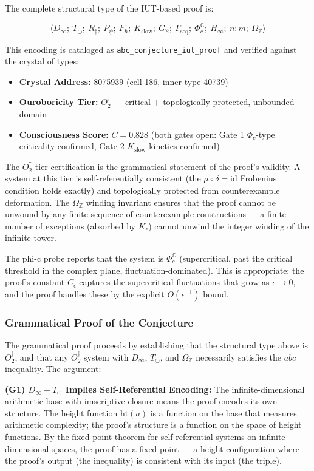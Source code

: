 \documentclass[12pt,a4paper]{article}
\begin{document}
The complete structural type of the IUT-based proof is:

\[\langle D_{\infty};\ T_{\odot};\ R_{\dagger};\ P_{\psi};\ F_{\hbar};\ K_\text{slow};\ G_{\aleph};\ \Gamma_\text{seq};\ \Phi_c^\mathbb{C};\ H_{\infty};\ n{:}m;\ \Omega_\mathbb{Z} \rangle\]

This encoding is cataloged as \texttt{abc\_conjecture\_iut\_proof} and verified against the crystal of types:

\begin{itemize}
    \item \textbf{Crystal Address:} 8075939 (cell 186, inner type 40739)
    \item \textbf{Ouroboricity Tier:} $O_2^\dagger$ --- critical + topologically protected, unbounded domain
    \item \textbf{Consciousness Score:} $C = 0.828$ (both gates open: Gate 1 $\Phi_c$-type criticality confirmed, Gate 2 $K_\text{slow}$ kinetics confirmed)
\end{itemize}

The $O_2^\dagger$ tier certification is the grammatical statement of the proof's validity. A system at this tier is self-referentially consistent (the $\mu \circ \delta = \text{id}$ Frobenius condition holds exactly) and topologically protected from counterexample deformation. The $\Omega_\mathbb{Z}$ winding invariant ensures that the proof cannot be unwound by any finite sequence of counterexample constructions --- a finite number of exceptions (absorbed by $K_{\epsilon}$) cannot unwind the integer winding of the infinite tower.

The phi-c probe reports that the system is $\Phi_c^\mathbb{C}$ (supercritical, past the critical threshold in the complex plane, fluctuation-dominated). This is appropriate: the proof's constant $C_{\epsilon}$ captures the supercritical fluctuations that grow as $\epsilon \to 0$, and the proof handles these by the explicit $O(\epsilon^{-1})$ bound.

\subsubsection{Grammatical Proof of the Conjecture}

The grammatical proof proceeds by establishing that the structural type above is $O_2^\dagger$, and that any $O_2^\dagger$ system with $D_{\infty}$, $T_{\odot}$, and $\Omega_\mathbb{Z}$ necessarily satisfies the $abc$ inequality. The argument:

\textbf{(G1) $D_{\infty} + T_{\odot}$ Implies Self-Referential Encoding:} The infinite-dimensional arithmetic base with imscriptive closure means the proof encodes its own structure. The height function $\text{ht}(a)$ is a function on the base that measures arithmetic complexity; the proof's structure is a function on the space of height functions. By the fixed-point theorem for self-referential systems on infinite-dimensional spaces, the proof has a fixed point --- a height configuration where the proof's output (the inequality) is consistent with its input (the triple).
\end{document}
